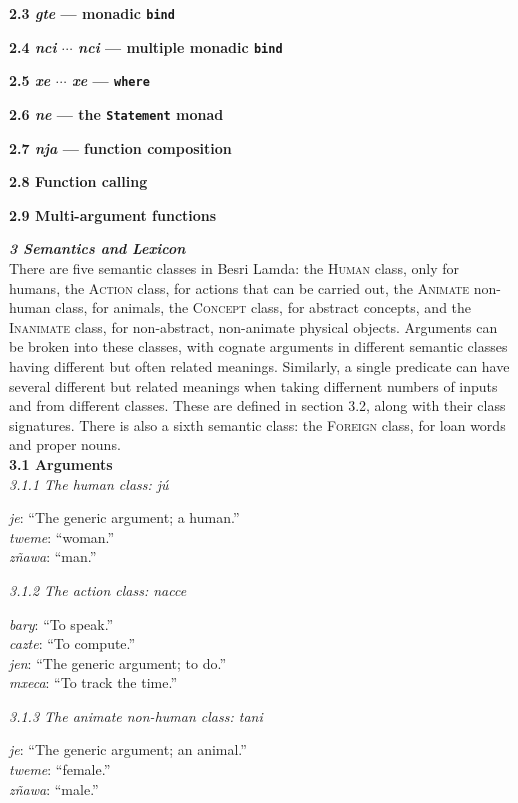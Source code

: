 \documentclass{article}[10pt]
\newcommand{\defarg}[2]{\emph{#1}: ``#2.''\\}
\begin{document}
{\bf 2.3 \emph{gte} --- monadic \texttt{bind}}
 
{\bf 2.4 \emph{nci} $\cdots$ \emph{nci} --- multiple monadic \texttt{bind}}

{\bf 2.5 \emph{xe} $\cdots$ \emph{xe} --- \texttt{where}}

{\bf 2.6 \emph{ne} --- the \texttt{Statement} monad}

{\bf 2.7 \emph{nja} --- function composition}

{\bf 2.8 Function calling}

{\bf 2.9 Multi-argument functions}

\clearpage
{\bf \emph{3 Semantics and Lexicon}}\\

There are five semantic classes in Besri Lamda: the \textsc{Human} class, only for humans, the \textsc{Action} class, for actions that can be carried out, the \textsc{Animate} non-human class, for animals, the \textsc{Concept} class, for abstract concepts, and the \textsc{Inanimate} class, for non-abstract, non-animate physical objects. Arguments can be broken into these classes, with cognate arguments in different semantic classes having different but often related meanings. Similarly, a single predicate can have several different but related meanings when taking differnent numbers of inputs and from different classes. These are defined in section 3.2, along with their class signatures. There is also a sixth semantic class: the \textsc{Foreign} class, for loan words and proper nouns.\\

{\bf 3.1 Arguments}\\

\emph{3.1.1 The human class: \emph{j\'{u}}}
\begin{multicols}{3}
\noindent
\defarg{je}{The generic argument; a human}
\defarg{tweme}{woman}
\defarg{z\~{n}awa}{man}
\end{multicols}

\emph{3.1.2 The action class: \emph{nacce}}
\begin{multicols}{3}
\noindent
\defarg{bary}{To speak}
\defarg{cazte}{To compute}
\defarg{jen}{The generic argument; to do}
\defarg{mxeca}{To track the time}
\end{multicols}

\emph{3.1.3 The animate non-human class: \emph{tani}}
\begin{multicols}{3}
\noindent
\defarg{je}{The generic argument; an animal}
\defarg{tweme}{female}
\defarg{z\~{n}awa}{male}
\end{multicols}
\end{document}

